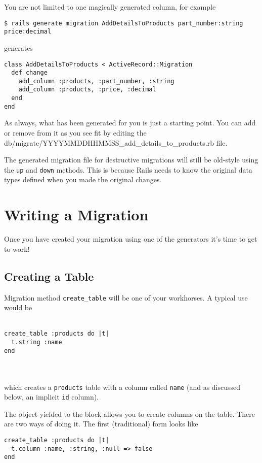 \documentclass[10pt]{book}
\begin{document}
You are not limited to one magically generated column, for example
\begin{verbatim}
$ rails generate migration AddDetailsToProducts part_number:string price:decimal
\end{verbatim}

generates
\begin{verbatim}
class AddDetailsToProducts < ActiveRecord::Migration
  def change
    add_column :products, :part_number, :string
    add_column :products, :price, :decimal
  end
end
\end{verbatim}

As always, what has been generated for you is just a starting point. You can add or remove from it as you see fit by editing the db/migrate/YYYYMMDDHHMMSS\_add\_details\_to\_products.rb file.

The generated migration file for destructive migrations will still be old-style using the \texttt{up} and \texttt{down} methods. This is because Rails needs to know the original data types defined when you made the original changes.

\section{ Writing a Migration}

Once you have created your migration using one of the generators it’s time to get to work!

\subsection{ Creating a Table}

Migration method \texttt{create\_table} will be one of your workhorses. A typical use would be
\\ \\
\begin{minipage}{\textwidth}
\begin{verbatim}
create_table :products do |t|
  t.string :name
end
\end{verbatim}
\end{minipage}
\\ \\


which creates a \texttt{products} table with a column called \texttt{name} (and as discussed below, an implicit \texttt{id} column).

The object yielded to the block allows you to create columns on the table. There are two ways of doing it. The first (traditional) form looks like
\begin{verbatim}
create_table :products do |t|
  t.column :name, :string, :null => false
end
\end{verbatim}
\end{document}
